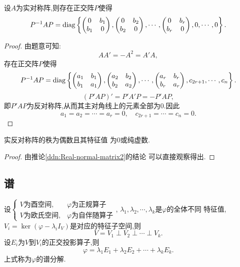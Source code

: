 \begin{deduction}\label{ddn:Real-normal-matrix2}
  设$A$为实对称阵,则存在正交阵$P$使得
  \[
    P^{-1}AP=\operatorname{diag}\left\{
    \begin{pmatrix}
      0&b_1\\
      b_1&0
    \end{pmatrix},
    \begin{pmatrix}
      0&b_2\\
      b_2&0
    \end{pmatrix},\cdots,
    \begin{pmatrix}
      0&b_r\\
      b_r&0
    \end{pmatrix},
    0,\cdots,0\right\}.
  \]
\end{deduction}

\begin{proof}
  由题意可知:
  \[
    AA'=-A^2=A'A,
  \]
  存在正交阵$P$使得
  \[
    P^{-1}AP=\operatorname{diag}\left\{
    \begin{pmatrix}
      a_1&b_1\\
      b_1&a_1
    \end{pmatrix},
    \begin{pmatrix}
      a_2&b_2\\
      b_2&a_2
    \end{pmatrix},\cdots,
    \begin{pmatrix}
      a_r&b_r\\
      b_r&a_r
    \end{pmatrix},
    c_{2r+1},\cdots,c_n\right\}.
\]
\[
  (P'AP)'=P'A'P=-P'AP,
\]
即$P'AP$为反对称阵,从而其主对角线上的元素全部为$0$.因此
\[
  a_1=a_2=\cdots=a_r=0, \quad c_{2r+1}=\cdots=c_n=0.
\]
\end{proof}

\begin{deduction}\label{ddn:Real-normal-matrix3}
  实反对称阵的秩为偶数且其特征值
  为$0$或纯虚数.
\end{deduction}

\begin{proof}
  由推论\ref{ddn:Real-normal-matrix2}的结论
  可以直接观察得出.
\end{proof}

\subsection{谱}

\begin{theorem}[谱分析定理]\label{thm:Spectrum1}
  设$\begin{cases} V\text{为酉空间}, &\varphi\text{为正规算子}\\
    V\text{为欧氏空间}, &\varphi\text{为自伴随算子}\end{cases}$,
  $\lambda_1,\lambda_2,\cdots,\lambda_k$是$\varphi$的全体不同
  特征值, $V_i=\ker(\varphi-\lambda_iI_V)$是对应的特征子空间,则
  \[
    V=V_1\perp V_2\perp\cdots\perp V_k.
  \]
  设$E_i$为$V$到$V_i$的正交投影算子,则
  \[
    \varphi=\lambda_1E_1+\lambda_2E_2+\cdots+\lambda_kE_k.
  \]
  上式称为$\varphi$的谱分解.
\end{theorem}

